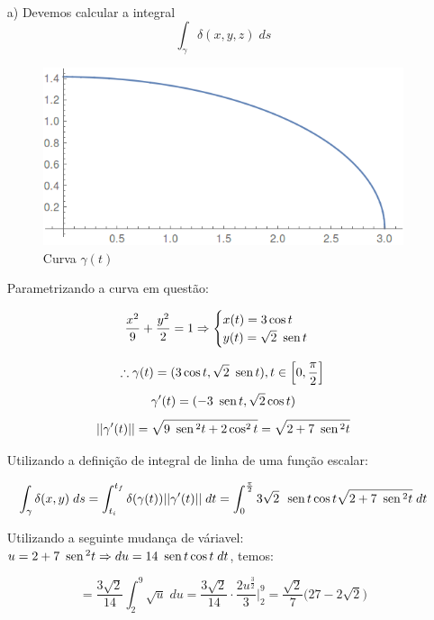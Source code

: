 \documentclass[12pt,a4paper]{article}
\newcommand{\sen}{\mbox{\, sen}\,}
\begin{document}
 \\

\begin{itemize}
\item[a)]
Devemos calcular a integral
$$  \int_{\gamma}{\delta(x,y,z)}\;ds $$

\begin{figure}[H]
	\centering
	\includegraphics[scale=0.4]{Fig2aB.png}  
	\caption{Curva $\gamma(t)$}
	\label{fig:figura2aB}
\end{figure}

Parametrizando a curva em questão:

$$
\frac{x^2}{9} + \frac{y^2}{2} = 1
\Rightarrow
\begin{cases}
x(t) = 3\cos t \\
y(t) = \sqrt{2}\sen t\\
\end{cases}
$$

$$ \therefore \gamma(t) = (3\cos t, \sqrt{2}\sen t), t \in \Big[0,\frac{\pi}{2}\Big] $$
$$ \gamma'(t) = (-3\sen t, \sqrt{2}\cos t) $$
$$ ||\gamma'(t)|| = \sqrt{9\sen^2 t + 2\cos^2 t} = \sqrt{2 + 7\sen^2 t} $$

Utilizando a definição de integral de linha de uma função escalar:

$$  \int_{\gamma}{\delta(x,y)}\;ds = \int_{t_i}^{t_f} {\delta(\gamma(t)) ||\gamma'(t) ||}\;dt = \int_{0}^{\frac{\pi}{2}} 3 \sqrt{2} \, \sen t \cos t \sqrt{2 + 7\sen^2 t} \;dt $$

Utilizando a seguinte mudança de váriavel: $u = 2 + 7\sen^2 t \Rightarrow du = 14\sen t \cos t \; dt $, temos:

$$ = \frac{3\sqrt{2}}{14} \int_2^9 \sqrt{u} \; du =   \frac{3\sqrt{2}}{14} \cdot \frac{2u^{\frac{3}{2}}}{3} \Big|_2^9 = \frac{\sqrt{2}}{7} \Big( 27 - 2\sqrt{2} \Big)  $$


\end{itemize}
\end{document}
